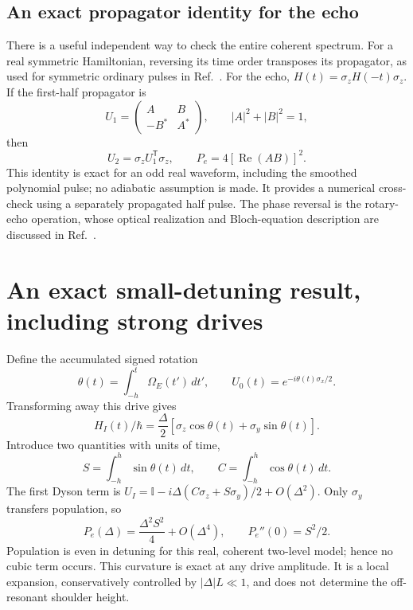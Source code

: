\documentclass[11pt]{article}
\newcommand{\Pe}{P_e}
\newcommand{\Om}{\Omega}
\begin{document}
\subsection{An exact propagator identity for the echo}
There is a useful independent way to check the entire coherent spectrum.
For a real symmetric Hamiltonian, reversing its time order transposes its
propagator, as used for symmetric ordinary pulses in Ref.~\cite{smooth2024}.
For the echo, $H(t)=\sigma_z H(-t)\sigma_z$. If the first-half propagator is
\begin{equation}
 U_1=\begin{pmatrix}A&B\\-B^*&A^*\end{pmatrix},\qquad
 |A|^2+|B|^2=1,
\end{equation}
then
\begin{equation}
 U_2=\sigma_z U_1^{\mathsf T}\sigma_z,\qquad
 \boxed{\Pe=4[\operatorname{Re}(AB)]^2.}
 \label{eq:half-identity}
\end{equation}
This identity is exact for an odd real waveform, including the smoothed
polynomial pulse; no adiabatic assumption is made. It provides a numerical
cross-check using a separately propagated half pulse. The phase reversal
is the rotary-echo operation, whose optical realization and Bloch-equation
description are discussed in Ref.~\cite{rotary1980}.

\section{An exact small-detuning result, including strong drives}
Define the accumulated signed rotation
\begin{equation}
 \theta(t)=\int_{-h}^{t}\Om_E(t')\,dt',\qquad
 U_0(t)=e^{-i\theta(t)\sigma_x/2}.
\end{equation}
Transforming away this drive gives
\begin{equation}
 H_I(t)/\hbar=\frac{\Delta}{2}
 [\sigma_z\cos\theta(t)+\sigma_y\sin\theta(t)].
\end{equation}
Introduce two quantities with units of time,
\begin{equation}
 S=\int_{-h}^{h}\sin\theta(t)\,dt,\qquad
 C=\int_{-h}^{h}\cos\theta(t)\,dt.
 \label{eq:SC}
\end{equation}
The first Dyson term is
$U_I=\mathbb I-i\Delta(C\sigma_z+S\sigma_y)/2+O(\Delta^2)$.
Only $\sigma_y$ transfers population, so
\begin{equation}
 \boxed{\Pe(\Delta)=\frac{\Delta^2 S^2}{4}+O(\Delta^4),\qquad
 \Pe''(0)=S^2/2.}
 \label{eq:curvature}
\end{equation}
Population is even in detuning for this real, coherent two-level model;
hence no cubic term occurs. This curvature is exact at any drive amplitude.
It is a local expansion, conservatively controlled by $|\Delta|L\ll1$,
and does not determine the off-resonant shoulder height.
\end{document}
